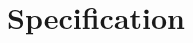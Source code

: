 \documentclass[CSCI3100_Documentation]{subfiles}
\begin{document}
  \section{Specification}
\end{document}
